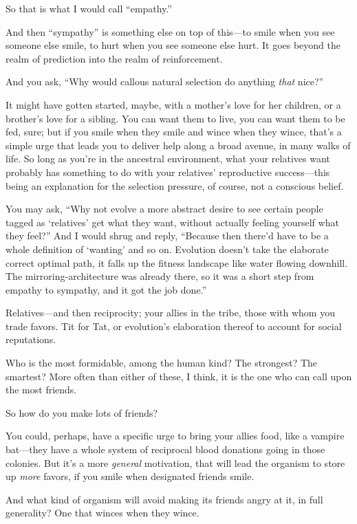 {
 So that is what I would call
``empathy.''}

{
 And then ``sympathy'' is
something else on top of this---to smile when you see someone else
smile, to hurt when you see someone else hurt. It goes beyond the realm
of prediction into the realm of reinforcement.}

{
 And you ask, ``Why would callous natural
selection do anything \textit{that} nice?''}

{
 It might have gotten started, maybe, with a
mother's love for her children, or a
brother's love for a sibling. You can want them to
live, you can want them to be fed, sure; but if you smile when they
smile and wince when they wince, that's a simple urge
that leads you to deliver help along a broad avenue, in many walks of
life. So long as you're in the ancestral environment,
what your relatives want probably has something to do with your
relatives' reproductive success---this being an
explanation for the selection pressure, of course, not a conscious
belief.}

{
 You may ask, ``Why not evolve a more abstract
desire to see certain people tagged as
`relatives' get what they want, without
actually feeling yourself what they feel?'' And I
would shrug and reply, ``Because then
there'd have to be a whole definition of
`wanting' and so on. Evolution
doesn't take the elaborate correct optimal path, it
falls up the fitness landscape like water flowing downhill. The
mirroring-architecture was already there, so it was a short step from
empathy to sympathy, and it got the job done.''}

{
 Relatives---and then reciprocity; your allies in the tribe, those
with whom you trade favors. Tit for Tat, or evolution's
elaboration thereof to account for social reputations.}

{
 Who is the most formidable, among the human kind? The strongest?
The smartest? More often than either of these, I think, it is the one
who can call upon the most friends.}

{
 So how do you make lots of friends?}

{
 You could, perhaps, have a specific urge to bring your allies
food, like a vampire bat---they have a whole system of reciprocal blood
donations going in those colonies. But it's a more
\textit{general} motivation, that will lead the organism to store up
\textit{more} favors, if you smile when designated friends smile.}

{
 And what kind of organism will avoid making its friends angry at
it, in full generality? One that winces when they wince.}

